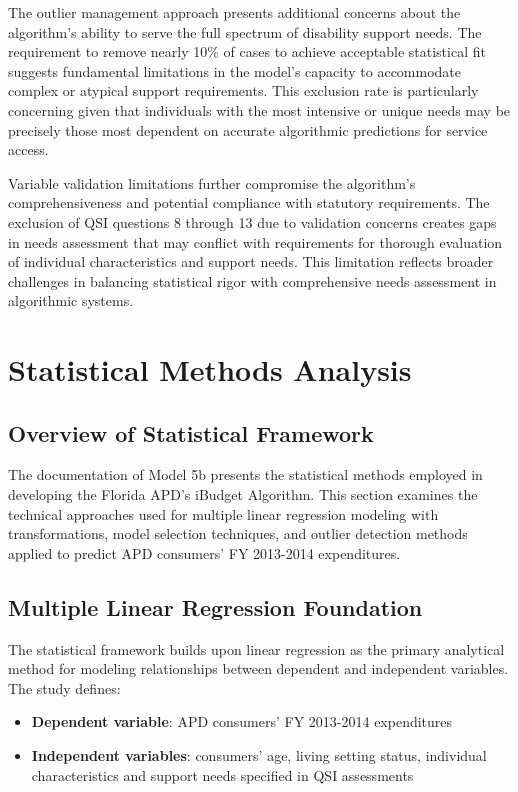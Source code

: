 The outlier management approach presents additional concerns about the algorithm's ability to serve the full spectrum of disability support needs. The requirement to remove nearly 10\% of cases to achieve acceptable statistical fit suggests fundamental limitations in the model's capacity to accommodate complex or atypical support requirements. This exclusion rate is particularly concerning given that individuals with the most intensive or unique needs may be precisely those most dependent on accurate algorithmic predictions for service access.

Variable validation limitations further compromise the algorithm's comprehensiveness and potential compliance with statutory requirements. The exclusion of QSI questions 8 through 13 due to validation concerns creates gaps in needs assessment that may conflict with requirements for thorough evaluation of individual characteristics and support needs. This limitation reflects broader challenges in balancing statistical rigor with comprehensive needs assessment in algorithmic systems.

\section{Statistical Methods Analysis}

\subsection{Overview of Statistical Framework}

The documentation of Model 5b presents the statistical methods employed in developing the Florida APD's iBudget Algorithm. This section examines the technical approaches used for multiple linear regression modeling with transformations, model selection techniques, and outlier detection methods applied to predict APD consumers' FY 2013-2014 expenditures.

\subsection{Multiple Linear Regression Foundation}

The statistical framework builds upon linear regression as the primary analytical method for modeling relationships between dependent and independent variables. The study defines:

\begin{itemize}
    \item \textbf{Dependent variable}: APD consumers' FY 2013-2014 expenditures
    \item \textbf{Independent variables}: consumers' age, living setting status, individual characteristics and support needs specified in QSI assessments
\end{itemize}

